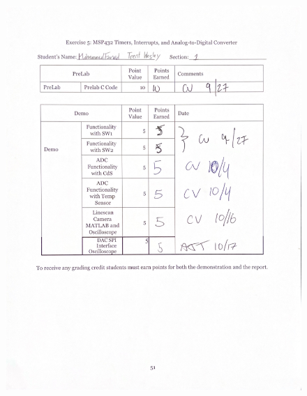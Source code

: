 \documentclass[CMPE]{KGCOEReport}
\begin{document}
\newpage
\begin{figure}[H]
    \centering
    \begin{adjustbox}{center}
        \includegraphics[width=1.26\textwidth]{signoff.pdf}
    \end{adjustbox}
\end{figure}
\end{document}

